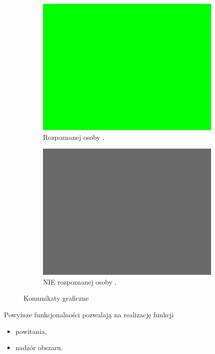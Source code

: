 \documentclass[a4paper,12pt,reqno]{article}
\begin{document}
\begin{figure}[H]%
	\centering
	\begin{subfigure}{.5\textwidth}
		\centering
		\includegraphics[width=0.8\linewidth]{imgs/testy_rozpoznana.jpg}
		\caption{Rozpoznanej osoby \cite{img_me}.}	
		\label{komunikatgraficzny:rozpoznana}
	\end{subfigure}%
	\begin{subfigure}{.5\textwidth}
		\centering
		\includegraphics[width=0.8\linewidth]{imgs/testy_NIErozpoznana.jpg}
		\caption{NIE rozpoznanej osoby \cite{img_me}.}
		\label{komunikatgraficzny:NIErozpoznana}
	\end{subfigure}%
\caption{Komunikaty graficzne}
\label{komunikatgraficzny:komunikatgraficzny}
\end{figure}

Powyższe funkcjonalności pozwalają na realizację funkcji

\begin{itemize}
	\item powitania,
	\item nadzór obszaru.
\end{itemize}
\end{document}
